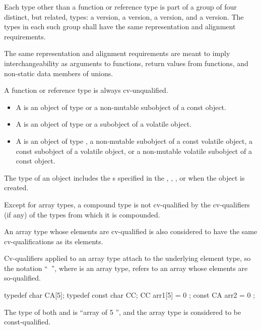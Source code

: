\pnum
{}%
%
%
Each type other than a function or reference type
is part of a group of four distinct, but related, types:
a  version,
a  version,
a  version, and
a  version.
The types in each such group shall have
the same representation and alignment requirements.
\begin{footnote}
The same representation and alignment requirements
are meant to imply interchangeability as
arguments to functions,
return values from functions, and
non-static data members of unions.
\end{footnote}
A function or reference type is always cv-unqualified.
\begin{itemize}
\item A  is an object of type  or a
  non-mutable subobject of a const object.

\item A  is an object of type
   or a subobject of a volatile object.

\item A  is an object of type
  , a non-mutable subobject of a const volatile object,
  a const subobject of a volatile object, or a non-mutable volatile
  subobject of a const object.
\end{itemize}
\begin{note}
The type of an object includes
the s specified in the
,
,
, or
when the object is created.
\end{note}

\pnum
Except for array types, a compound type is not cv-qualified by the
cv-qualifiers (if any) of the types from which it is compounded.

\pnum
{}%
An array type whose elements are cv-qualified
is also considered to have the same cv-qualifications
as its elements.
\begin{note}
Cv-qualifiers applied to an array
type attach to the underlying element type, so the notation
``\cv{}~'', where  is an array type, refers to
an array whose elements are so-qualified.
\end{note}
\begin{example}
\begin{codeblock}
typedef char CA[5];
typedef const char CC;
CC arr1[5] = { 0 };
const CA arr2 = { 0 };
\end{codeblock}
The type of both  and  is ``array of 5
'', and the array type is considered to be
const-qualified.
\end{example}

